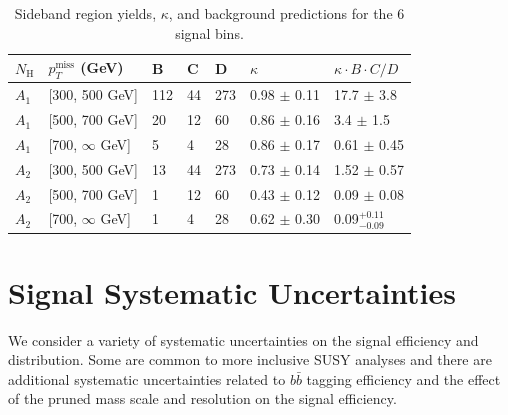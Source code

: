 \begin{table}
\centering
\caption{
Sideband region yields, $\kappa$, and background predictions for the 6 signal bins.
}
\begin{tabular}{lllllll}
\hline
\hline
$N_{\mathrm{H}}$ & $p_{T}^{\mathrm{miss}}$ (GeV) & B & C & D & $\kappa$  & $\kappa \cdot B \cdot C / D$ \\
\hline
$A_{1}$ & [300, 500 GeV]      & 112 & 44  & 273 & 0.98 $\pm$ 0.11 & 17.7 $\pm$ 3.8\\
$A_{1}$ & [500, 700 GeV]      & 20   & 12  & 60   & 0.86 $\pm$ 0.16 & 3.4  $\pm$ 1.5\\
$A_{1}$ & [700, $\infty$ GeV] & 5    & 4    & 28   & 0.86 $\pm$ 0.17 & 0.61 $\pm$ 0.45\\
$A_{2}$ & [300, 500 GeV]      & 13   & 44  & 273 & 0.73 $\pm$ 0.14 & 1.52 $\pm$ 0.57\\
$A_{2}$ & [500, 700 GeV]      & 1     & 12  & 60   & 0.43 $\pm$ 0.12 & 0.09 $\pm$ 0.08\\
$A_{2}$ & [700, $\infty$ GeV] & 1     & 4     & 28   & 0.62 $\pm$ 0.30 & 0.09$^{+0.11}_{-0.09}$\\
\hline
\hline
\end{tabular}
\label{tab:tab}
\end{table}

\section{Signal Systematic Uncertainties}
\label{sec:signalsys}
We consider a variety of systematic uncertainties on the signal efficiency and distribution. Some are common to more 
inclusive SUSY analyses \cite{RA2b:Moriond} and there are additional systematic uncertainties related to $b\bar{b}$ tagging efficiency and 
the effect of the pruned mass scale and resolution on the signal efficiency.  

